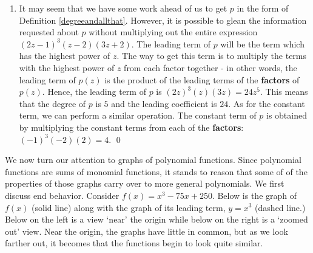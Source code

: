 \documentclass{ximera}
\begin{document}
\begin{example}
\begin{enumerate}
\item  It may seem that we have some work ahead of us to get $p$ in the form of Definition \ref{degreeandallthat}.  However, it is possible to glean the information requested about $p$ without multiplying out the entire expression $(2z-1)^{3}(z-2)(3z+2)$.  The leading term of $p$ will be the term which has the highest power of $z$.  The way to get this term  is to multiply the terms with the highest power of $z$ from each factor together - in other words, the leading term of $p(z)$ is the product of the leading terms of the \textbf{factors} of $p(z)$.  Hence, the leading term of $p$ is $(2z)^3(z)(3z) =  24z^5$.  This means that the degree of $p$ is $5$ and the leading coefficient is $24$.  As for the constant term, we can perform a similar operation.  The constant term  of $p$ is obtained by multiplying the constant terms from each of the \textbf{factors}: $(-1)^3(-2)(2) = 4$.  \qed

\end{enumerate}

\end{example}


We now turn our attention to graphs of polynomial functions. Since polynomial functions are sums of monomial functions, it stands to reason that some of of the properties of those graphs carry over to more general polynomials. We first discuss end behavior.  Consider $f(x) = x^3-75x+250$.   Below  is the graph of  $f(x)$ (solid line) along with the graph of its leading term, $y = x^3$ (dashed line.)  Below on the left is a view `near' the origin while below on the right is a `zoomed out' view.  Near the origin, the graphs have little in common, but as we look farther out, it becomes that the functions begin to look quite similar.  
\end{document}
